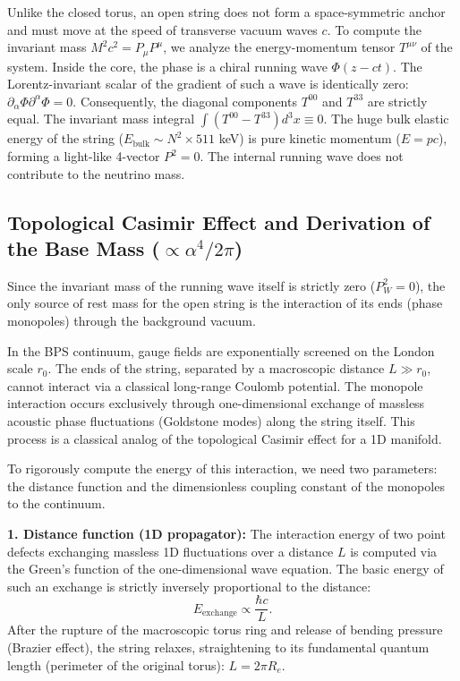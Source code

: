 \documentclass[11pt,a4paper]{article}
\begin{document}
Unlike the closed torus, an open string does not form a space-symmetric anchor and must move at the speed of transverse vacuum waves $c$. To compute the invariant mass $M^2 c^2 = P_\mu P^\mu$, we analyze the energy-momentum tensor $T^{\mu\nu}$ of the system.
Inside the core, the phase is a chiral running wave $\Phi(z-ct)$. The Lorentz-invariant scalar of the gradient of such a wave is identically zero: $\partial_\alpha \Phi \partial^\alpha \Phi = 0$.
Consequently, the diagonal components $T^{00}$ and $T^{33}$ are strictly equal. The invariant mass integral $\int (T^{00} - T^{33}) d^3x \equiv 0$. The huge bulk elastic energy of the string ($E_{\text{bulk}} \sim N^2 \times 511$ keV) is pure kinetic momentum ($E = pc$), forming a light-like 4-vector $P^2 = 0$. The internal running wave does not contribute to the neutrino mass.

\subsection{Topological Casimir Effect and Derivation of the Base Mass ($\propto \alpha^4 / 2\pi$)}
Since the invariant mass of the running wave itself is strictly zero ($P_W^2 = 0$), the only source of rest mass for the open string is the interaction of its ends (phase monopoles) through the background vacuum.

In the BPS continuum, gauge fields are exponentially screened on the London scale $r_0$. The ends of the string, separated by a macroscopic distance $L \gg r_0$, cannot interact via a classical long-range Coulomb potential. The monopole interaction occurs exclusively through one-dimensional exchange of massless acoustic phase fluctuations (Goldstone modes) along the string itself. This process is a classical analog of the topological Casimir effect for a 1D manifold.

To rigorously compute the energy of this interaction, we need two parameters: the distance function and the dimensionless coupling constant of the monopoles to the continuum.

\textbf{1. Distance function (1D propagator):}
The interaction energy of two point defects exchanging massless 1D fluctuations over a distance $L$ is computed via the Green's function of the one-dimensional wave equation. The basic energy of such an exchange is strictly inversely proportional to the distance:
\begin{equation}
E_{\text{exchange}} \propto \frac{\hbar c}{L}.
\end{equation}
After the rupture of the macroscopic torus ring and release of bending pressure (Brazier effect), the string relaxes, straightening to its fundamental quantum length (perimeter of the original torus): $L = 2\pi R_e$.
\end{document}
